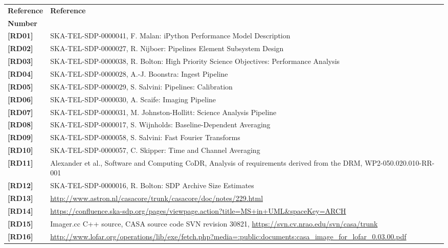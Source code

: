 \documentclass[11pt,a4paper]{article}
\begin{document}
 \begin{center}{
 \begin{tabularx}{\textwidth}{|l|X|}
     \hline
     \bf{Reference} & \bf{Reference}\\
     \bf{Number} & \\
     \hline
     {\bf [RD01]} & SKA-TEL-SDP-0000041, F. Malan: iPython Performance Model Description\\
    {\bf [RD02]} & SKA-TEL-SDP-0000027, R. Nijboer: Pipelines Element Subsystem Design\\
    {\bf [RD03]} & SKA-TEL-SDP-0000038, R. Bolton: High Priority Science Objectives: Performance Analysis\\
    {\bf [RD04]} & SKA-TEL-SDP-0000028, A.-J. Boonstra: Ingest Pipeline\\
    {\bf [RD05]} & SKA-TEL-SDP-0000029, S. Salvini: Pipelines: Calibration\\
    {\bf [RD06]} & SKA-TEL-SDP-0000030, A. Scaife: Imaging Pipeline\\
    {\bf [RD07]} & SKA-TEL-SDP-0000031, M. Johnston-Hollitt: Science Analysis Pipeline\\
    {\bf [RD08]} & SKA-TEL-SDP-0000017, S. Wijnholds: Baseline-Dependent
    Averaging\\
    {\bf [RD09]} & SKA-TEL-SDP-0000058, S. Salvini: Fast Fourier Transforms\\
    {\bf [RD10]} & SKA-TEL-SDP-0000057, C. Skipper: Time and Channel Averaging\\
    {\bf [RD11]} & Alexander et al., Software and Computing CoDR, Analysis of requirements derived from the DRM, WP2-050.020.010-RR-001\\
    {\bf [RD12]} & SKA-TEL-SDP-0000016, R. Bolton: SDP Archive Size
    Estimates\\
    {\bf [RD13]} & \url{http://www.astron.nl/casacore/trunk/casacore/doc/notes/229.html}\\
    {\bf [RD14]} & \url{https://confluence.ska-sdp.org/pages/viewpage.action?title=MS+in+UML&spaceKey=ARCH}\\
    {\bf [RD15]} & Imager.cc C++ source, CASA source code SVN revision 30821,
    \url{https://svn.cv.nrao.edu/svn/casa/trunk}\\ 
    {\bf [RD16]} & \url{http://www.lofar.org/operations/lib/exe/fetch.php?media=:public:documents:casa_image_for_lofar_0.03.00.pdf}\\
     \hline
   \end{tabularx}}
\end{center}
\end{document}
